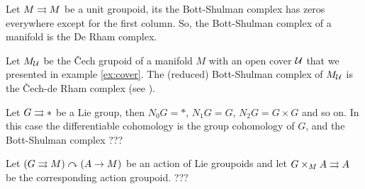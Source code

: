 \begin{example}
Let $M\rightrightarrows M$ be a unit groupoid, its the Bott-Shulman complex has zeros everywhere except for the first column.
So, the Bott-Shulman complex of a manifold is the De Rham complex.
\end{example}

\begin{example}
Let $M_{\mathcal{U}}$ be the \v{C}ech grupoid of a manifold $M$ with an open cover $\mathcal{U}$ that we presented in example \ref{ex:cover}.
The (reduced) Bott-Shulman complex of $M_{\mathcal{U}}$ is the \v{C}ech-de Rham complex (see \cite[chapter 2]{bott-tu}).
\end{example}

\begin{example}
Let $G\rightrightarrows *$ be a Lie group, then $N_0G=*$, $N_1G=G$, $N_2G=G\times G$ and so on.
In this case the differentiable cohomology is the group cohomology of $G$, and the Bott-Shulman complex ???
\end{example}

\begin{example}
Let $(G\rightrightarrows M)\curvearrowright(A\to M)$ be an action of Lie groupoids and let $G\times_M A\rightrightarrows A$ be the corresponding action groupoid. ???
\end{example}






